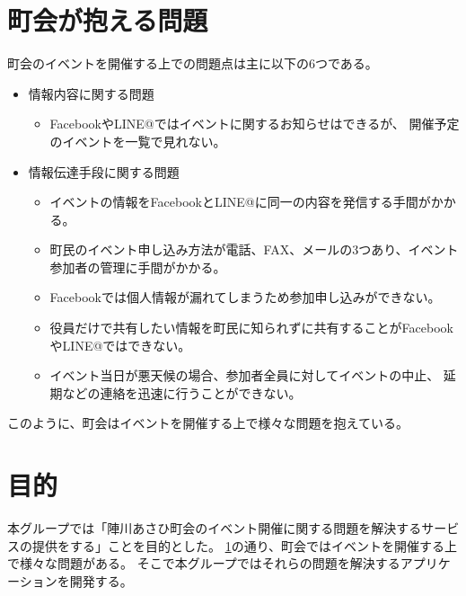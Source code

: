 \section{町会が抱える問題}
\label{problems}
町会のイベントを開催する上での問題点は主に以下の6つである。
\begin{itemize}
    \item 情報内容に関する問題
    \begin{itemize}
        \item FacebookやLINE@ではイベントに関するお知らせはできるが、
              開催予定のイベントを一覧で見れない。
    \end{itemize}
    \item 情報伝達手段に関する問題
    \begin{itemize}
        \item イベントの情報をFacebookとLINE@に同一の内容を発信する手間がかかる。
        \item 町民のイベント申し込み方法が電話、FAX、メールの3つあり、イベント参加者の管理に手間がかかる。
        \item Facebookでは個人情報が漏れてしまうため参加申し込みができない。
        \item 役員だけで共有したい情報を町民に知られずに共有することがFacebookやLINE@ではできない。
    \end{itemize}
    \begin{itemize}
        \item イベント当日が悪天候の場合、参加者全員に対してイベントの中止、
              延期などの連絡を迅速に行うことができない。
    \end{itemize}
\end{itemize}
このように、町会はイベントを開催する上で様々な問題を抱えている。

\section{目的}
本グループでは「陣川あさひ町会のイベント開催に関する問題を解決するサービスの提供をする」ことを目的とした。
\ref{problems}の通り、町会ではイベントを開催する上で様々な問題がある。
そこで本グループではそれらの問題を解決するアプリケーションを開発する。
